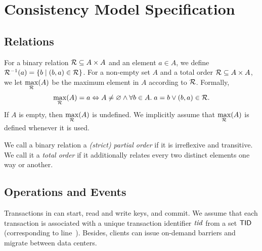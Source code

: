 
\section{Consistency Model Specification} \label{section:spec}

\subsection{Relations} \label{ss:relations}

For a binary relation $\mathcal{R} \subseteq A \times A$
and an element $a \in A$, we define
$\mathcal{R}^{-1}(a) = \{b \mid (b, a) \in \mathcal{R}\}$.
For a non-empty set $A$ and a total order $\mathcal{R} \subseteq A \times A$,
we let $\max\limits_{\mathcal{R}}(A)$ be the maximum element in $A$
according to $\mathcal{R}$. Formally,
\[
  \max_{\mathcal{R}}(A) = a \Leftrightarrow A \neq \varnothing
    \land \forall b \in A.\; a = b \lor (b, a) \in \mathcal{R}.
\]
If $A$ is empty, then $\max\limits_{\mathcal{R}}(A)$ is undefined.
We implicitly assume that $\max\limits_{\mathcal{R}}(A)$ is defined
whenever it is used.

We call a binary relation a \emph{(strict) partial order}
if it is irreflexive and transitive.
We call it a \emph{total order} if it additionally
relates every two distinct elements one way or another.
\subsection{Operations and Events} \label{ss:operations}

Transactions in \unistore{} can start, read and write keys, and commit.
We assume that each transaction is associated with a unique transaction identifier
$\mathit{tid}$ from a set ${\sf TID}$ (corresponding to
line~\code{\ref{alg:unistore-coord}}{\ref{line:start-return}}).
Besides, clients can issue on-demand barriers and migrate between data centers.

